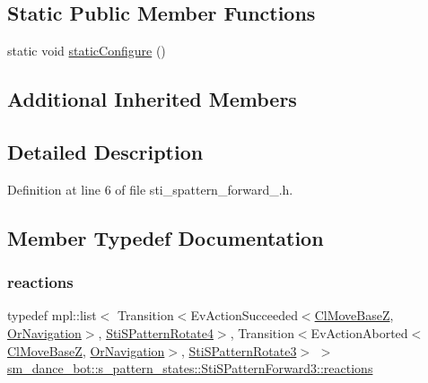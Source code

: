 \subsection*{Static Public Member Functions}
\begin{DoxyCompactItemize}
\item 
static void \hyperlink{structsm__dance__bot_1_1s__pattern__states_1_1StiSPatternForward3_a95b52e8147aa4169010fa9bc00ea63e0}{static\+Configure} ()
\end{DoxyCompactItemize}
\subsection*{Additional Inherited Members}


\subsection{Detailed Description}


Definition at line 6 of file sti\+\_\+spattern\+\_\+forward\+\_.\+h.



\subsection{Member Typedef Documentation}
\mbox{\label{structsm__dance__bot_1_1s__pattern__states_1_1StiSPatternForward3_a7547d6e7da81d22253dcc9e93f8c29eb}} 
\subsubsection{\texorpdfstring{reactions}{reactions}}
{\footnotesize\ttfamily typedef mpl\+::list$<$ Transition$<$Ev\+Action\+Succeeded$<$\hyperlink{classmove__base__z__client_1_1ClMoveBaseZ}{Cl\+Move\+BaseZ}, \hyperlink{classsm__dance__bot_1_1OrNavigation}{Or\+Navigation}$>$, \hyperlink{structsm__dance__bot_1_1s__pattern__states_1_1StiSPatternRotate4}{Sti\+S\+Pattern\+Rotate4}$>$, Transition$<$Ev\+Action\+Aborted$<$\hyperlink{classmove__base__z__client_1_1ClMoveBaseZ}{Cl\+Move\+BaseZ}, \hyperlink{classsm__dance__bot_1_1OrNavigation}{Or\+Navigation}$>$, \hyperlink{structsm__dance__bot_1_1s__pattern__states_1_1StiSPatternRotate3}{Sti\+S\+Pattern\+Rotate3}$>$ $>$ \hyperlink{structsm__dance__bot_1_1s__pattern__states_1_1StiSPatternForward3_a7547d6e7da81d22253dcc9e93f8c29eb}{sm\+\_\+dance\+\_\+bot\+::s\+\_\+pattern\+\_\+states\+::\+Sti\+S\+Pattern\+Forward3\+::reactions}}




